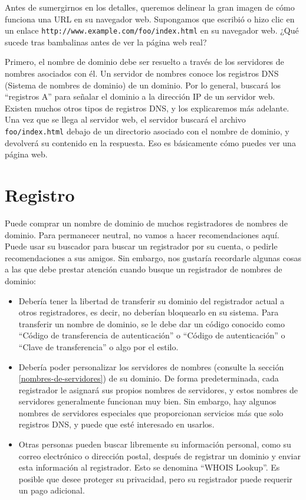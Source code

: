 \documentclass[12pt,]{krantz}
\theoremstyle{definition}
\theoremstyle{definition}
\theoremstyle{definition}
\theoremstyle{remark}
\begin{document}
Antes de sumergirnos en los detalles, queremos delinear la gran imagen
de cómo funciona una URL en su navegador web. Supongamos que escribió o
hizo clic en un enlace \texttt{http://www.example.com/foo/index.html} en
su navegador web. ¿Qué sucede tras bambalinas antes de ver la página web
real?

Primero, el nombre de dominio debe ser resuelto a través de los
servidores de nombres asociados con él. Un servidor de nombres conoce
los registros DNS (Sistema de nombres de dominio) de un dominio. Por lo
general, buscará los ``registros A'' para señalar el dominio a la
dirección IP de un servidor web. Existen muchos otros tipos de registros
DNS, y los explicaremos más adelante. Una vez que se llega al servidor
web, el servidor buscará el archivo \texttt{foo/index.html} debajo de un
directorio asociado con el nombre de dominio, y devolverá su contenido
en la respuesta. Eso es básicamente cómo puedes ver una página web.

\hypertarget{registro}{%
\section{Registro}\label{registro}}

Puede comprar un nombre de dominio de muchos registradores de nombres de
dominio. Para permanecer neutral, no vamos a hacer recomendaciones aquí.
Puede usar su buscador para buscar un registrador por su cuenta, o
pedirle recomendaciones a sus amigos. Sin embargo, nos gustaría
recordarle algunas cosas a las que debe prestar atención cuando busque
un registrador de nombres de dominio:

\begin{itemize}
\item
  Debería tener la libertad de transferir su dominio del registrador
  actual a otros registradores, es decir, no deberían bloquearlo en su
  sistema. Para transferir un nombre de dominio, se le debe dar un
  código conocido como ``Código de transferencia de autenticación'' o
  ``Código de autenticación'' o ``Clave de transferencia'' o algo por el
  estilo.
\item
  Debería poder personalizar los servidores de nombres (consulte la
  sección \ref{nombres-de-servidores}) de su dominio. De forma
  predeterminada, cada registrador le asignará sus propios nombres de
  servidores, y estos nombres de servidores generalmente funcionan muy
  bien. Sin embargo, hay algunos nombres de servidores especiales que
  proporcionan servicios más que solo registros DNS, y puede que esté
  interesado en usarlos.
\item
  Otras personas pueden buscar libremente su información personal, como
  su correo electrónico o dirección postal, después de registrar un
  dominio y enviar esta información al registrador. Esto se denomina
  ``WHOIS Lookup''. Es posible que desee proteger su privacidad, pero su
  registrador puede requerir un pago adicional.
\end{itemize}
\end{document}
